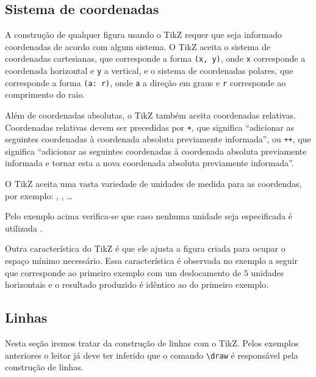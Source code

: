 \subsection{Sistema de coordenadas}
A construção de qualquer figura usando o TikZ requer que seja informado coordenadas de acordo com algum sistema. O TikZ aceita o sistema de coordenadas cartesianas, que corresponde a forma \lstinline!(x, y)!, onde \lstinline!x! corresponde a coordenada horizontal e \lstinline!y! a vertical, e o sistema de coordenadas polares, que corresponde a forma \lstinline!(a: r)!, onde \lstinline!a! a direção em graus e \lstinline!r! corresponde ao comprimento do raio. \\

Além de coordenadas absolutas, o TikZ também aceita coordenadas relativas. Coordenadas relativas devem ser precedidas por \lstinline!+!, que significa ``adicionar as seguintes coordenadas \`{a} coordenada absoluta previamente informada'', ou \lstinline!++!, que significa ``adicionar as seguintes coordenadas \`{a} coordenada absoluta previamente informada e tornar esta a nova coordenada absoluta previamente informada''. \\

O TikZ aceita uma vasta variedade de unidades de medida para as coordendas, por exemplo: , ,  \ldots \\

Pelo exemplo acima verifica-se que caso nenhuma unidade seja especificada é utilizada .

Outra característica do TikZ é que ele ajusta a figura criada para ocupar o espaço mínimo necessário. Essa característica é observada no exemplo a seguir que corresponde ao primeiro exemplo com um deslocamento de $5$ unidades horizontais e o resultado produzido é idêntico ao do primeiro exemplo. \\

\subsection{Linhas}
Nesta seção iremos tratar da construção de linhas com o TikZ. Pelos exemplos anteriores o leitor já deve ter inferido que o comando \lstinline!\draw! é responsável pela construção de linhas.

